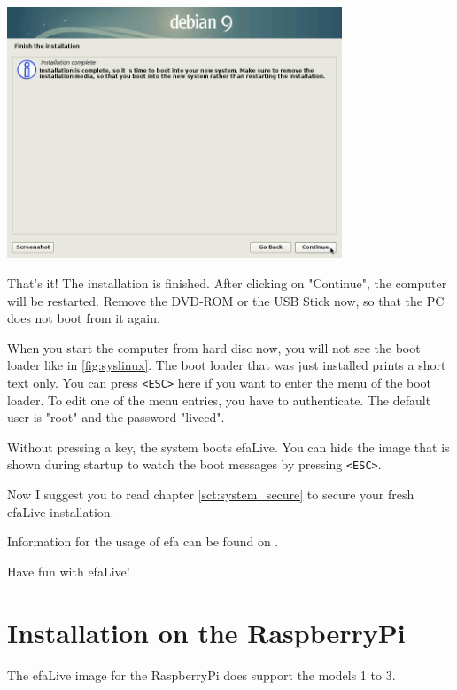 \documentclass[a4paper,12pt,twoside]{article}
\begin{document}
\bigskip
\begin{minipage}{\linewidth}
    \centering
    \captionsetup{type=figure}
    \includegraphics[width=10cm]{screenshots/finish_installation.png}
    \label{fig:finish}
\end{minipage}
\bigskip

That's it! The installation is finished. After clicking
on "Continue", the computer will be
restarted. Remove the DVD-ROM or the USB Stick now, so that the PC does
not boot from it again.

When you start the computer from hard disc now, you will not see the
boot loader like in \ref{fig:syslinux}. The boot loader that was just
installed prints a short text only. You can press
\texttt{{\textless}ESC{\textgreater}} here if you want to enter the menu of the
boot loader. To edit one of the menu entries, you have to authenticate.
The default user is "root" and the password "livecd".

Without pressing a key, the system boots efaLive. You can hide the image
that is shown during startup to watch the boot messages by pressing
\texttt{{\textless}ESC{\textgreater}}.

Now I suggest you to read chapter \ref{sct:system_secure} to
secure your fresh efaLive installation.

\bigskip
Information for the usage of efa can be found on \cite{EFA2}.

\bigskip
Have fun with efaLive!


\section{Installation on the RaspberryPi}
\label{sct:instalation_raspberry}
The efaLive image for the RaspberryPi does support the models 1 to 3.
\end{document}
